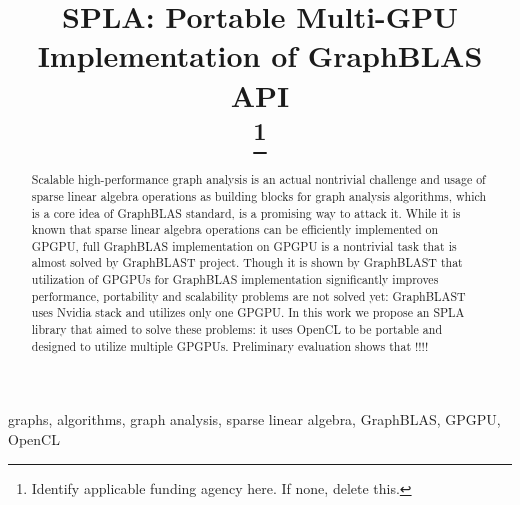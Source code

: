 \documentclass[conference]{IEEEtran}
\begin{document}
\title{SPLA: Portable Multi-GPU Implementation of GraphBLAS API\\
\thanks{Identify applicable funding agency here. If none, delete this.}
}

\author{
\and
{}
\and
{}
}

\maketitle

\begin{abstract}
    Scalable high-performance graph analysis is an actual nontrivial challenge and usage of sparse linear algebra operations as building blocks for graph analysis algorithms, which is a core idea of GraphBLAS standard, is a promising way to attack it.
    While it is known that sparse linear algebra operations can be efficiently implemented on GPGPU, full GraphBLAS implementation on GPGPU is a nontrivial task that is almost solved by GraphBLAST project. Though it is shown by GraphBLAST that utilization of GPGPUs for GraphBLAS implementation significantly improves performance, portability and scalability problems are not solved yet: GraphBLAST uses Nvidia stack and utilizes only one GPGPU.
    In this work we propose an SPLA library that aimed to solve these problems: it uses OpenCL to be portable and designed to utilize multiple GPGPUs.
    Preliminary evaluation shows that !!!!
\end{abstract}

\begin{IEEEkeywords}
graphs, algorithms, graph analysis, sparse linear algebra, GraphBLAS, GPGPU, OpenCL
\end{IEEEkeywords}








\end{document}
